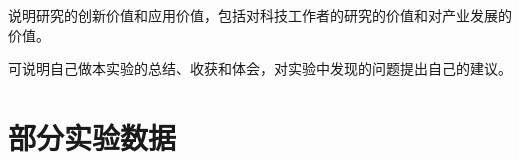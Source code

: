 \documentclass{thuemp}
\begin{document}
说明研究的创新价值和应用价值，包括对科技工作者的研究的价值和对产业发展的价值。

可说明自己做本实验的总结、收获和体会，对实验中发现的问题提出自己的建议。



\renewcommand\refname{\heiti\wuhao\centerline{参考文献}\global\def\refname{参考文献}}
\vskip 12pt


\let\OLDthebibliography\thebibliography
\renewcommand\thebibliography[1]{
  \OLDthebibliography{#1}
  \setlength{\parskip}{0pt}
  \setlength{\itemsep}{0pt plus 0.3ex}
}

{
\renewcommand{\baselinestretch}{0.9}
\liuhao


}

\appendix
\section{部分实验数据}
\end{document}
